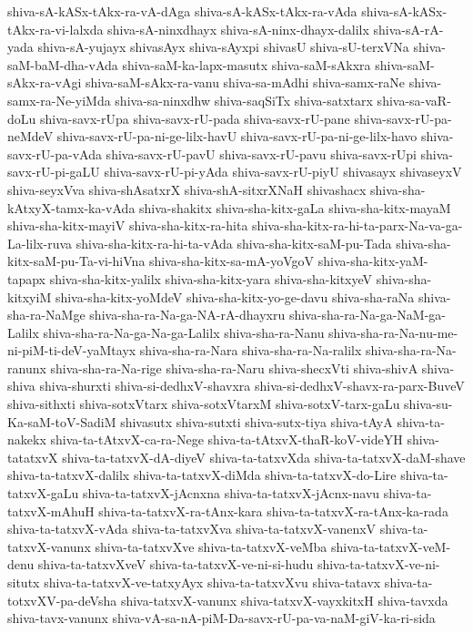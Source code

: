 {shiva-sA-kASx-tAkx-ra-vA-dAga
shiva-sA-kASx-tAkx-ra-vAda
shiva-sA-kASx-tAkx-ra-vi-lalxda
shiva-sA-ninxdhayx
shiva-sA-ninx-dhayx-dalilx
shiva-sA-rA-yada
shiva-sA-yujayx
shivasAyx
shiva-sAyxpi
shivasU
shiva-sU-terxVNa
shiva-saM-baM-dha-vAda
shiva-saM-ka-lapx-masutx
shiva-saM-sAkxra
shiva-saM-sAkx-ra-vAgi
shiva-saM-sAkx-ra-vanu
shiva-sa-mAdhi
shiva-samx-raNe
shiva-samx-ra-Ne-yiMda
shiva-sa-ninxdhw
shiva-saqSiTx
shiva-satxtarx
shiva-sa-vaR-doLu
shiva-savx-rUpa
shiva-savx-rU-pada
shiva-savx-rU-pane
shiva-savx-rU-pa-neMdeV
shiva-savx-rU-pa-ni-ge-lilx-havU
shiva-savx-rU-pa-ni-ge-lilx-havo
shiva-savx-rU-pa-vAda
shiva-savx-rU-pavU
shiva-savx-rU-pavu
shiva-savx-rUpi
shiva-savx-rU-pi-gaLU
shiva-savx-rU-pi-yAda
shiva-savx-rU-piyU
shivasayx
shivaseyxV
shiva-seyxVva
shiva-shAsatxrX
shiva-shA-sitxrXNaH
shivashacx
shiva-sha-kAtxyX-tamx-ka-vAda
shiva-shakitx
shiva-sha-kitx-gaLa
shiva-sha-kitx-mayaM
shiva-sha-kitx-mayiV
shiva-sha-kitx-ra-hita
shiva-sha-kitx-ra-hi-ta-parx-Na-va-ga-La-lilx-ruva
shiva-sha-kitx-ra-hi-ta-vAda
shiva-sha-kitx-saM-pu-Tada
shiva-sha-kitx-saM-pu-Ta-vi-hiVna
shiva-sha-kitx-sa-mA-yoVgoV
shiva-sha-kitx-yaM-tapapx
shiva-sha-kitx-yalilx
shiva-sha-kitx-yara
shiva-sha-kitxyeV
shiva-sha-kitxyiM
shiva-sha-kitx-yoMdeV
shiva-sha-kitx-yo-ge-davu
shiva-sha-raNa
shiva-sha-ra-NaMge
shiva-sha-ra-Na-ga-NA-rA-dhayxru
shiva-sha-ra-Na-ga-NaM-ga-Lalilx
shiva-sha-ra-Na-ga-Na-ga-Lalilx
shiva-sha-ra-Nanu
shiva-sha-ra-Na-nu-me-ni-piM-ti-deV-yaMtayx
shiva-sha-ra-Nara
shiva-sha-ra-Na-ralilx
shiva-sha-ra-Na-ranunx
shiva-sha-ra-Na-rige
shiva-sha-ra-Naru
shiva-shecxVti
shiva-shivA
shiva-shiva
shiva-shurxti
shiva-si-dedhxV-shavxra
shiva-si-dedhxV-shavx-ra-parx-BuveV
shiva-sithxti
shiva-sotxVtarx
shiva-sotxVtarxM
shiva-sotxV-tarx-gaLu
shiva-su-Ka-saM-toV-SadiM
shivasutx
shiva-sutxti
shiva-sutx-tiya
shiva-tAyA
shiva-ta-nakekx
shiva-ta-tAtxvX-ca-ra-Nege
shiva-ta-tAtxvX-thaR-koV-videYH
shiva-tatatxvX
shiva-ta-tatxvX-dA-diyeV
shiva-ta-tatxvXda
shiva-ta-tatxvX-daM-shave
shiva-ta-tatxvX-dalilx
shiva-ta-tatxvX-diMda
shiva-ta-tatxvX-do-Lire
shiva-ta-tatxvX-gaLu
shiva-ta-tatxvX-jAcnxna
shiva-ta-tatxvX-jAcnx-navu
shiva-ta-tatxvX-mAhuH
shiva-ta-tatxvX-ra-tAnx-kara
shiva-ta-tatxvX-ra-tAnx-ka-rada
shiva-ta-tatxvX-vAda
shiva-ta-tatxvXva
shiva-ta-tatxvX-vanenxV
shiva-ta-tatxvX-vanunx
shiva-ta-tatxvXve
shiva-ta-tatxvX-veMba
shiva-ta-tatxvX-veM-denu
shiva-ta-tatxvXveV
shiva-ta-tatxvX-ve-ni-si-hudu
shiva-ta-tatxvX-ve-ni-situtx
shiva-ta-tatxvX-ve-tatxyAyx
shiva-ta-tatxvXvu
shiva-tatavx
shiva-ta-totxvXV-pa-deVsha
shiva-tatxvX-vanunx
shiva-tatxvX-vayxkitxH
shiva-tavxda
shiva-tavx-vanunx
shiva-vA-sa-nA-piM-Da-savx-rU-pa-va-naM-giV-ka-ri-sida
}
